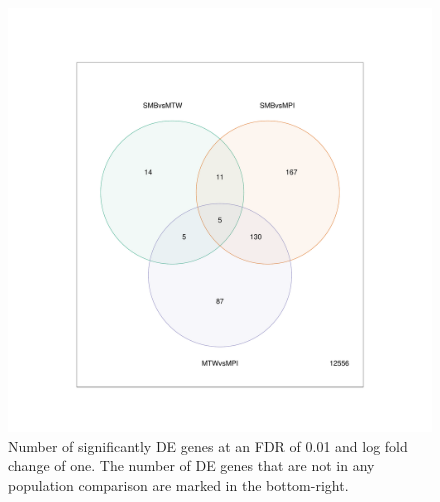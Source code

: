 \documentclass[12pt,a4paper,titlepage,twoside,openright]{book}
\begin{document}
\begin{mainmatter}
{{\begin{figure}[htb!]
\centering
\includegraphics[width=\textwidth,height=\textheight,keepaspectratio]{Figures/vennDiagram_allSigDEGenes_pval01_FDR1_dupCor.pdf}
\caption{Number of significantly DE genes at an FDR of 0.01 and log fold change of one. The number of DE genes that are not in any population comparison are marked in the bottom-right.}
\label{fig:Venn Diagram between Islands}
\end{figure}

}}
\end{mainmatter}
\end{document}
